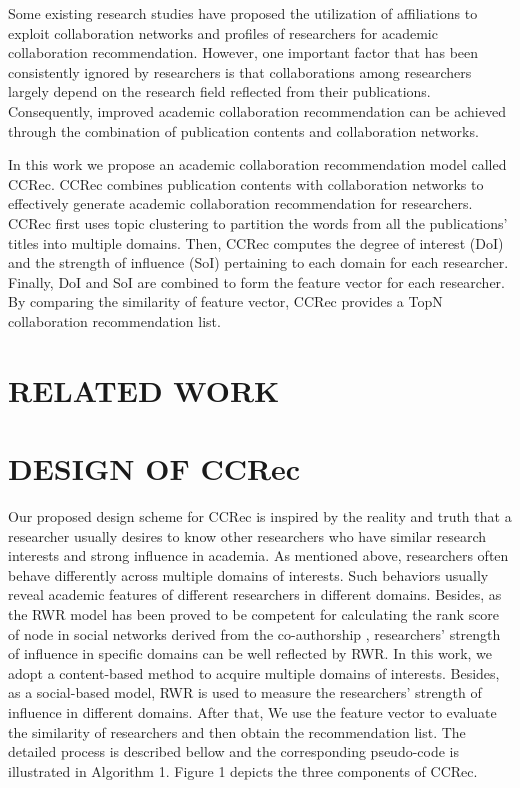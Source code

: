 \documentclass{acm_proc_article-sp}
\begin{document}
Some existing research studies \cite{benchettara2010supervised} \cite{brandao2012affiliation} \cite{brandao2013using} have proposed the utilization of affiliations to exploit collaboration networks and profiles of researchers for academic collaboration recommendation. However, one important factor that has been consistently ignored by researchers is that collaborations among researchers largely depend on the research field reflected from their publications. Consequently, improved academic collaboration recommendation can be achieved through the combination of publication contents and collaboration networks.

In this work we propose an academic collaboration recommendation model called CCRec. CCRec combines publication contents with collaboration networks to effectively generate academic collaboration recommendation for researchers. CCRec first uses topic clustering to partition the words from all the publications' titles into multiple domains. Then, CCRec computes the degree of interest (DoI) and the strength of influence (SoI) pertaining to each domain for each researcher. Finally, DoI and SoI are combined to form the feature vector for each researcher. By comparing the similarity of feature vector, CCRec provides a TopN collaboration recommendation list.

\section{RELATED WORK}


\section{DESIGN OF CCRec}
Our proposed design scheme for CCRec is inspired by the reality and truth that a researcher usually desires to know other researchers who have similar research interests and strong influence in academia. As mentioned above, researchers often behave differently across multiple domains of interests. Such behaviors usually reveal academic features of different researchers in different domains. Besides, as the RWR model has been proved to be competent for calculating the rank score of node in social networks derived from the co-authorship \cite{li2014acrec}, researchers' strength of influence in specific domains can be well reflected by RWR. In this work, we adopt a content-based method to acquire multiple domains of interests. Besides, as a social-based model, RWR is used to measure the researchers' strength of influence in different domains. After that, We use the feature vector to evaluate the similarity of researchers and then obtain the recommendation list. The detailed process is described bellow and the corresponding pseudo-code is illustrated in Algorithm 1. Figure 1 depicts the three components of CCRec.
\end{document}
